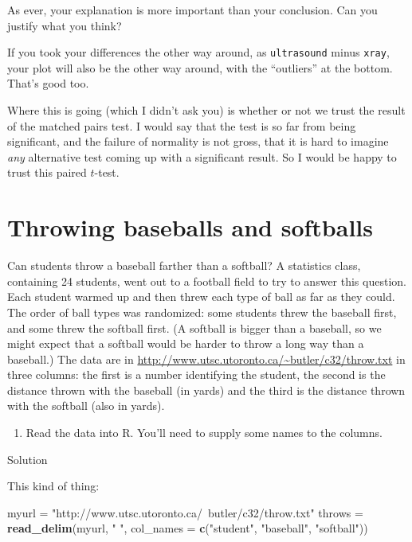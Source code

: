 \documentclass[]{tufte-book}
\newenvironment{Shaded}{}{}
\newcommand{\DataTypeTok}[1]{\textcolor[rgb]{0.56,0.13,0.00}{#1}}
\newcommand{\KeywordTok}[1]{\textcolor[rgb]{0.00,0.44,0.13}{\textbf{#1}}}
\newcommand{\NormalTok}[1]{#1}
\newcommand{\StringTok}[1]{\textcolor[rgb]{0.25,0.44,0.63}{#1}}
\providecommand{\tightlist}{%
  \setlength{\itemsep}{0pt}\setlength{\parskip}{0pt}}
\theoremstyle{definition}
\theoremstyle{definition}
\theoremstyle{definition}
\theoremstyle{remark}
\begin{document}
As ever, your explanation is more important than your conclusion. Can
you justify what you think?

If you took your differences the other way around, as
\texttt{ultrasound} minus \texttt{xray}, your plot will also be the
other way around, with the ``outliers'' at the bottom. That's good too.

Where this is going (which I didn't ask you) is whether or not we trust
the result of the matched pairs test. I would say that the test is so
far from being significant, and the failure of normality is not gross,
that it is hard to imagine \emph{any} alternative test coming up with a
significant result. So I would be happy to trust this paired \(t\)-test.

\hypertarget{throwing-baseballs-and-softballs}{%
\section{Throwing baseballs and
softballs}\label{throwing-baseballs-and-softballs}}

Can students throw a baseball farther than a softball? A statistics
class, containing 24 students, went out to a football field to try to
answer this question. Each student warmed up and then threw each type of
ball as far as they could. The order of ball types was randomized: some
students threw the baseball first, and some threw the softball first. (A
softball is bigger than a baseball, so we might expect that a softball
would be harder to throw a long way than a baseball.) The data are in
\url{http://www.utsc.utoronto.ca/~butler/c32/throw.txt} in three
columns: the first is a number identifying the student, the second is
the distance thrown with the baseball (in yards) and the third is the
distance thrown with the softball (also in yards).

\begin{enumerate}
\def\labelenumi{(\alph{enumi})}
\tightlist
\item
  Read the data into R. You'll need to supply some names to the columns.
\end{enumerate}

Solution

This kind of thing:

\begin{Shaded}
\begin{Highlighting}[]
\NormalTok{myurl =}\StringTok{ "http://www.utsc.utoronto.ca/~butler/c32/throw.txt"}
\NormalTok{throws =}\StringTok{ }\KeywordTok{read_delim}\NormalTok{(myurl, }\StringTok{" "}\NormalTok{, }\DataTypeTok{col_names =} \KeywordTok{c}\NormalTok{(}\StringTok{"student"}\NormalTok{, }
    \StringTok{"baseball"}\NormalTok{, }\StringTok{"softball"}\NormalTok{))}
\end{Highlighting}
\end{Shaded}
\end{document}
